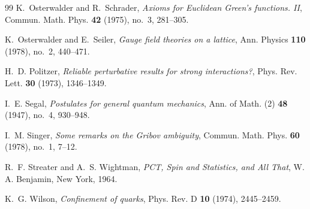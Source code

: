 \documentclass[11pt,reqno]{amsart}
\theoremstyle{plain}
\theoremstyle{definition}
\theoremstyle{remark}
\numberwithin{equation}{section}
\begin{document}
\begin{thebibliography}{99}
K.~Osterwalder and R.~Schrader, \emph{Axioms for {E}uclidean {G}reen's functions. {II}}, Commun. Math. Phys. \textbf{42} (1975), no.~3, 281--305.

K.~Osterwalder and E.~Seiler, \emph{Gauge field theories on a lattice}, Ann. Physics \textbf{110} (1978), no.~2, 440--471.

H.~D. Politzer, \emph{Reliable perturbative results for strong interactions?}, Phys. Rev. Lett. \textbf{30} (1973), 1346--1349.

I.~E. Segal, \emph{Postulates for general quantum mechanics}, Ann. of Math. (2) \textbf{48} (1947), no.~4, 930--948.

I.~M. Singer, \emph{Some remarks on the {G}ribov ambiguity}, Commun. Math. Phys. \textbf{60} (1978), no.~1, 7--12.

R.~F. Streater and A.~S. Wightman, \emph{{PCT}, Spin and Statistics, and All That}, W. A. Benjamin, New York, 1964.

K.~G. Wilson, \emph{Confinement of quarks}, Phys. Rev. D \textbf{10} (1974), 2445--2459.

\end{thebibliography}
\end{document}
